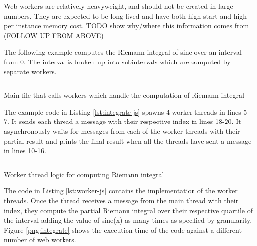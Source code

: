 \documentclass[11pt]{book}
\begin{document}
Web workers are relatively heavyweight, and should not be created in large numbers. They are expected to be long lived and have both high start and high per instance memory cost. 
TODO show why/where this information comes from (FOLLOW UP FROM ABOVE)

The following example computes the Riemann integral of sine over an interval from 0. The interval is broken up into subintervals which are computed by separate workers.

\begin{listing}[H] 
        \inputminted[fontsize=\small,baselinestretch=0.5,linenos]{javascript}{code/worker/integrate.js}
        \caption{Main file that calls workers which handle the computation of Riemann integral} 
        
        \label{lst:integrate-js}    
\end{listing} 

The example code in Listing \ref{lst:integrate-js} spawns 4 worker threads in lines 5-7. It sends each thread a message with their respective index in lines 18-20. It asynchronously waits for messages from each of the worker threads with their partial result and prints the final result when all the threads have sent a message in lines 10-16.
\begin{listing}[H] 
        \inputminted[fontsize=\small,baselinestretch=0.5,linenos]{javascript}{code/worker/worker.js}
        \caption{Worker thread logic for computing Riemann integral} 
        \label{lst:worker-js}    
\end{listing}    

The code in Listing \ref{lst:worker-js} contains the implementation of the worker threads. Once the thread receives a message from the main thread with their index, they compute the partial Riemann integral over their respective quartile of the interval adding the value of sine(x) as many times as specified by granularity. Figure \ref{png:integrate} shows the execution time of the code against a different number of web workers.
\end{document}
